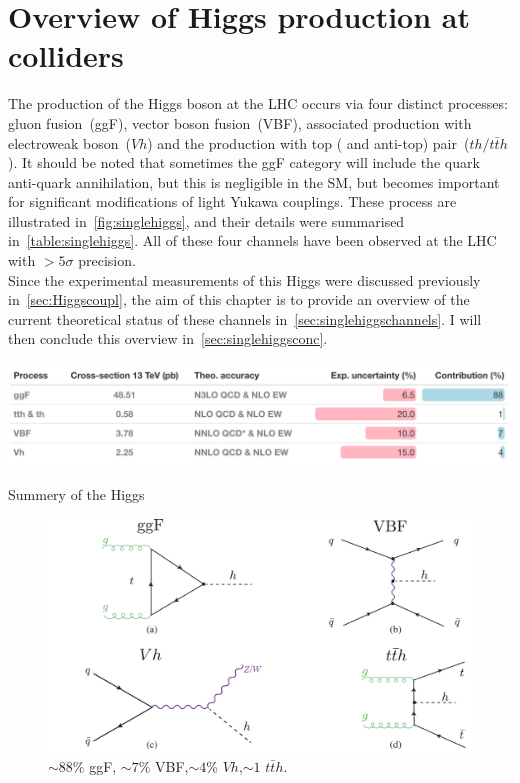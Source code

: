 \chapter{ Overview of Higgs production at colliders }\label{chap:overviewSingleHiggs}
The production of the Higgs boson at the LHC occurs via four distinct processes: gluon fusion~(ggF), vector boson fusion~(VBF), associated production with electroweak boson~($Vh$) and the production with top ( and anti-top) pair~($th / t \bar th$). It should be noted that sometimes the ggF category will include the quark anti-quark annihilation, but this is negligible in the SM, but becomes important for significant modifications of light Yukawa couplings. These process are illustrated in~\autoref{fig:singlehiggs}, and their details were summarised in~\autoref{table:singlehiggs}. All of these four channels have been observed at the LHC with $>5 \sigma$ precision. \\ 
Since the experimental measurements of this Higgs were discussed previously in~\autoref{sec:Higgscoupl}, the aim of this chapter is to provide an overview of the current theoretical status of these channels in~\autoref{sec:singlehiggschannels}. I will then conclude this overview in~\autoref{sec:singlehiggsconc}. 
\begin{table}[htbp!]
	\includegraphics[width=1\textwidth]{single_higgs_table}
	\caption{ Summery  of the Higgs \label{table:singlehiggs} }
\end{table}
\begin{figure}[htbp!]
	\begin{center}
		\includegraphics[width=.75\textwidth]{figures/single_higgs}
		\caption{$\sim88$\% ggF, $\sim 7$\% VBF,$\sim 4$\% $Vh$,$\sim1$ $t\bar t h$.  \label{fig:singlehiggs} }
	\end{center}
\end{figure}

